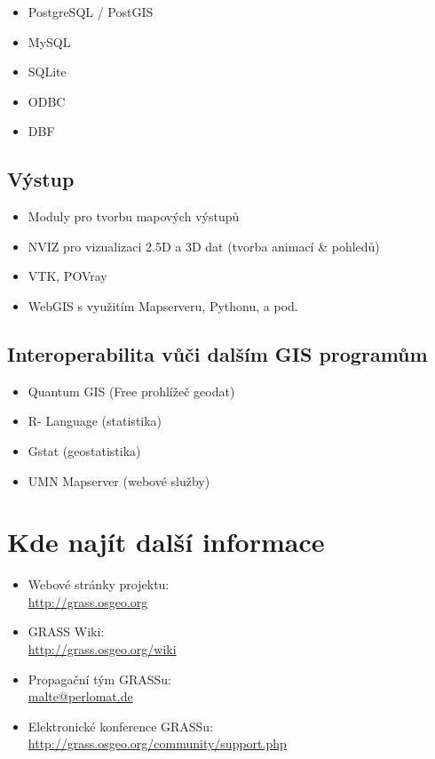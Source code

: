 \documentclass[notumble,a4paper,10pt,nofoldmark]{leaflet}
\newcommand{\GRASSurl}{\url{http://grass.osgeo.org}}
\begin{document}
\begin{itemize}
\item PostgreSQL / PostGIS
\item MySQL
\item SQLite
\item ODBC
\item DBF
\end{itemize}

\subsection{Výstup}

\begin{itemize}
\item Moduly pro tvorbu mapových výstupů
\item NVIZ pro vizualizaci 2.5D a 3D dat (tvorba animací \& pohledů)
\item VTK, POVray
\item WebGIS s využitím Mapserveru, Pythonu, a pod.
\end{itemize}

\subsection{Interoperabilita vůči dalším  GIS programům}

\begin{itemize}
\item Quantum GIS (Free prohlížeč geodat)
\item R- Language (statistika)
\item Gstat (geostatistika)
\item UMN Mapserver (webové služby)
\end{itemize}

\section{Kde najít další informace}

\begin{itemize}
\item{Webové stránky projektu: \\\GRASSurl}
\item{GRASS Wiki: \\\url{http://grass.osgeo.org/wiki}}
\item{Propagační tým GRASSu: \\\url{malte@perlomat.de}}
\item{Elektronické konference GRASSu:
    \\\url{http://grass.osgeo.org/community/support.php}}
\end{itemize}
\end{document}

